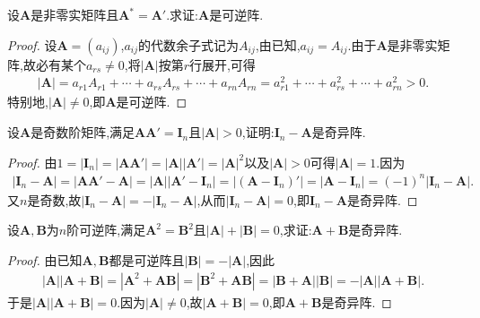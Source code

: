 \documentclass[../../main.tex]{subfiles}%
\begin{document}
\begin{example}
设\(\boldsymbol{A}\)是非零实矩阵且\(\boldsymbol{A}^* = \boldsymbol{A}'\).求证:\(\boldsymbol{A}\)是可逆阵.
\end{example}
\begin{proof}

设\(\boldsymbol{A} = (a_{ij})\),\(a_{ij}\)的代数余子式记为\(A_{ij}\),由已知,\(a_{ij} = A_{ij}\).由于\(\boldsymbol{A}\)是非零实矩阵,故必有某个\(a_{rs} \neq 0\),将\(|\boldsymbol{A}|\)按第\(r\)行展开,可得
\begin{align*}
|\boldsymbol{A}| = a_{r1}A_{r1} + \cdots + a_{rs}A_{rs} + \cdots + a_{rn}A_{rn} = a_{r1}^2 + \cdots + a_{rs}^2 + \cdots + a_{rn}^2 > 0.
\end{align*}
特别地,\(|\boldsymbol{A}| \neq 0\),即\(\boldsymbol{A}\)是可逆阵.

\end{proof}

\begin{example}
设\(\boldsymbol{A}\)是奇数阶矩阵,满足\(\boldsymbol{A}\boldsymbol{A}' = \boldsymbol{I}_{n}\)且\(|\boldsymbol{A}| > 0\),证明:\(\boldsymbol{I}_{n} - \boldsymbol{A}\)是奇异阵.
\end{example}
\begin{proof}

由\(1 = |\boldsymbol{I}_{n}| = |\boldsymbol{A}\boldsymbol{A}'| = |\boldsymbol{A}||\boldsymbol{A}'| = |\boldsymbol{A}|^{2}\)以及\(|\boldsymbol{A}| > 0\)可得\(|\boldsymbol{A}| = 1\).因为
\begin{align*}
|\boldsymbol{I}_{n} - \boldsymbol{A}| = |\boldsymbol{A}\boldsymbol{A}' - \boldsymbol{A}| = |\boldsymbol{A}||\boldsymbol{A}' - \boldsymbol{I}_{n}| = |(\boldsymbol{A} - \boldsymbol{I}_{n})'| = |\boldsymbol{A} - \boldsymbol{I}_{n}| = (-1)^{n}|\boldsymbol{I}_{n} - \boldsymbol{A}|.
\end{align*}
又\(n\)是奇数,故\(|\boldsymbol{I}_{n} - \boldsymbol{A}| = -|\boldsymbol{I}_{n} - \boldsymbol{A}|\),从而\(|\boldsymbol{I}_{n} - \boldsymbol{A}| = 0\),即\(\boldsymbol{I}_{n} - \boldsymbol{A}\)是奇异阵.

\end{proof}

\begin{example}
设\(\boldsymbol{A},\boldsymbol{B}\)为\(n\)阶可逆阵,满足\(\boldsymbol{A}^{2} = \boldsymbol{B}^{2}\)且\(|\boldsymbol{A}| + |\boldsymbol{B}| = 0\),求证:\(\boldsymbol{A} + \boldsymbol{B}\)是奇异阵.
\end{example}
\begin{proof}

由已知\(\boldsymbol{A},\boldsymbol{B}\)都是可逆阵且\(|\boldsymbol{B}| = -|\boldsymbol{A}|\),因此
\begin{align*}
|\boldsymbol{A}||\boldsymbol{A} + \boldsymbol{B}| = |\boldsymbol{A}^{2} + \boldsymbol{A}\boldsymbol{B}| = |\boldsymbol{B}^{2} + \boldsymbol{A}\boldsymbol{B}| = |\boldsymbol{B} + \boldsymbol{A}||\boldsymbol{B}| = -|\boldsymbol{A}||\boldsymbol{A} + \boldsymbol{B}|.
\end{align*}
于是\(|\boldsymbol{A}||\boldsymbol{A} + \boldsymbol{B}| = 0\).因为\(|\boldsymbol{A}| \neq 0\),故\(|\boldsymbol{A} + \boldsymbol{B}| = 0\),即\(\boldsymbol{A} + \boldsymbol{B}\)是奇异阵.

\end{proof}
\end{document}
